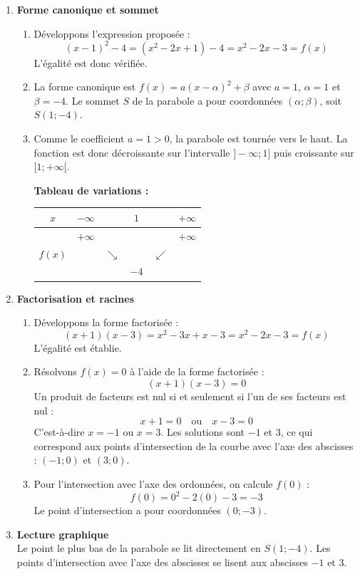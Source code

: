\documentclass[11pt,a4paper]{article}
\begin{document}
\begin{enumerate}
    \item \textbf{Forme canonique et sommet}
    \begin{enumerate}
        \item Développons l'expression proposée :
        $$(x - 1)^2 - 4 = (x^2 - 2x + 1) - 4 = x^2 - 2x - 3 = f(x)$$
        L'égalité est donc vérifiée.
        \item La forme canonique est $f(x) = a(x - \alpha)^2 + \beta$ avec $a = 1$, $\alpha = 1$ et $\beta = -4$. Le sommet $S$ de la parabole a pour coordonnées $(\alpha ; \beta)$, soit $S(1 ; -4)$.
        \item Comme le coefficient $a = 1 > 0$, la parabole est tournée vers le haut. La fonction est donc décroissante sur l'intervalle $]-\infty ; 1]$ puis croissante sur $[1 ; +\infty[$.
        
        \vspace{0.2cm}
        \noindent\textbf{Tableau de variations :} \\
        \begin{center}
        \begin{tabular}{|c|ccccc|}
        \hline
        $x$ & $-\infty$ & & $1$ & & $+\infty$ \\
        \hline
        & $+\infty$ & & & & $+\infty$ \\
        $f(x)$ & & $\searrow$ & & $\swarrow$ & \\
        & & & $-4$ & & \\
        \hline
        \end{tabular}
        \end{center}
    \end{enumerate}
    
    \item \textbf{Factorisation et racines}
    \begin{enumerate}
        \item Développons la forme factorisée :
        $$(x + 1)(x - 3) = x^2 - 3x + x - 3 = x^2 - 2x - 3 = f(x)$$
        L'égalité est établie.
        \item Résolvons $f(x) = 0$ à l'aide de la forme factorisée :
        $$(x + 1)(x - 3) = 0$$
        Un produit de facteurs est nul si et seulement si l'un de ses facteurs est nul :
        $$x + 1 = 0 \quad \text{ou} \quad x - 3 = 0$$
        C'est-à-dire $x = -1$ ou $x = 3$. Les solutions sont $-1$ et $3$, ce qui correspond aux points d'intersection de la courbe avec l'axe des abscisses : $(-1 ; 0)$ et $(3 ; 0)$.
        \item Pour l'intersection avec l'axe des ordonnées, on calcule $f(0)$ :
        $$f(0) = 0^2 - 2(0) - 3 = -3$$
        Le point d'intersection a pour coordonnées $(0 ; -3)$.
    \end{enumerate}
    
    \item \textbf{Lecture graphique} \\
    Le point le plus bas de la parabole se lit directement en $S(1 ; -4)$. Les points d'intersection avec l'axe des abscisses se lisent aux abscisses $-1$ et $3$.
\end{enumerate}
\end{document}
